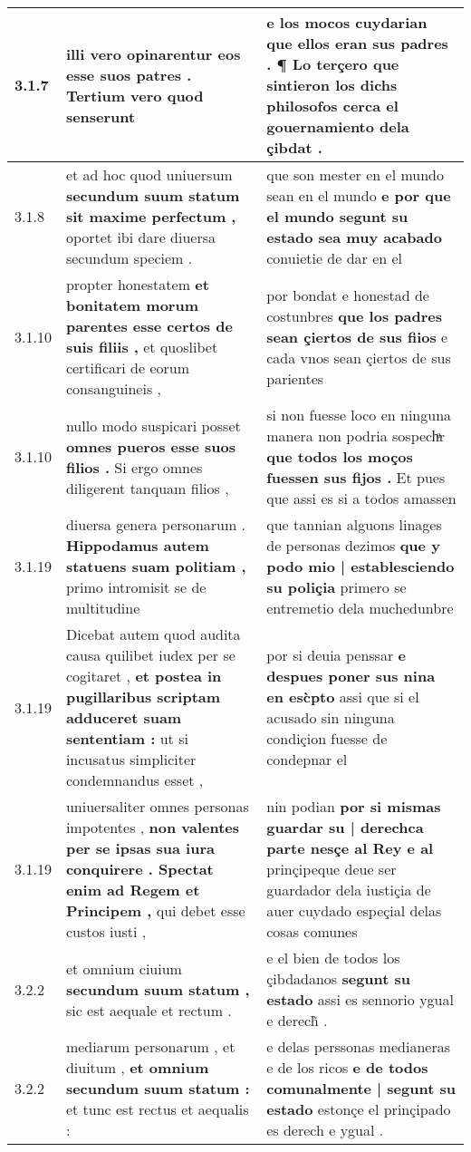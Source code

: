 \begin{tabular}{|p{1cm}|p{6.5cm}|p{6.5cm}|}
3.1.7 & illi vero opinarentur \textbf{ eos esse suos patres . } Tertium vero quod senserunt & e los mocos cuydarian \textbf{ que ellos eran sus padres . } ¶ Lo terçero que sintieron los dichs philosofos cerca el gouernamiento dela çibdat . \\\hline
3.1.8 & et ad hoc quod uniuersum \textbf{ secundum suum statum sit maxime perfectum , } oportet ibi dare diuersa secundum speciem . & que son mester en el mundo sean en el mundo \textbf{ e por que el mundo segunt su estado sea muy acabado } conuietie de dar en el \\\hline
3.1.10 & propter honestatem \textbf{ et bonitatem morum parentes esse certos de suis filiis , } et quoslibet certificari de eorum consanguineis , & por bondat e honestad de costunbres \textbf{ que los padres sean çiertos de sus fiios } e cada vnos sean çiertos de sus parientes \\\hline
3.1.10 & nullo modo suspicari posset \textbf{ omnes pueros esse suos filios . } Si ergo omnes diligerent tanquam filios , & si non fuesse loco en ninguna manera non podria sospechͣr \textbf{ que todos los moços fuessen sus fijos . } Et pues que assi es si a todos amassen \\\hline
3.1.19 & diuersa genera personarum . \textbf{ Hippodamus autem statuens suam politiam , } primo intromisit se de multitudine & que tannian alguons linages de personas dezimos \textbf{ que y podo mio | establesciendo su poliçia } primero se entremetio dela muchedunbre \\\hline
3.1.19 & Dicebat autem quod audita causa quilibet iudex per se cogitaret , \textbf{ et postea in pugillaribus scriptam adduceret suam sententiam : } ut si incusatus simpliciter condemnandus esset , & por si deuia penssar \textbf{ e despues poner sus nina en esc̀pto } assi que si el acusado sin ninguna condiçion fuesse de condepnar el \\\hline
3.1.19 & uniuersaliter omnes personas impotentes , \textbf{ non valentes per se ipsas sua iura conquirere . Spectat enim ad Regem et Principem , } qui debet esse custos iusti , & nin podian \textbf{ por si mismas guardar su | derechca parte nesçe al Rey e al } prinçipeque deue ser guardador dela iustiçia de auer cuydado espeçial delas cosas comunes \\\hline
3.2.2 & et omnium ciuium \textbf{ secundum suum statum , } sic est aequale et rectum . & e el bien de todos los çibdadanos \textbf{ segunt su estado } assi es sennorio ygual e derech̃ . \\\hline
3.2.2 & mediarum personarum , et diuitum , \textbf{ et omnium secundum suum statum : } et tunc est rectus et aequalis : & e delas perssonas medianeras e de los ricos \textbf{ e de todos comunalmente | segunt su estado } estonçe el prinçipado es derech e ygual . \\\hline

\end{tabular}
